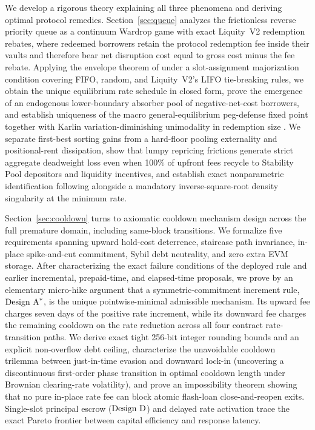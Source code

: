 We develop a rigorous theory explaining all three phenomena and deriving optimal protocol remedies. Section~\ref{sec:queue} analyzes the frictionless reverse priority queue as a continuum Wardrop game with exact Liquity~V2 redemption rebates, where redeemed borrowers retain the protocol redemption fee inside their vaults and therefore bear net disruption cost equal to gross cost minus the fee rebate. Applying the envelope theorem of \citet{milgrom2002envelope} under a slot-assignment majorization condition covering FIFO, random, and Liquity~V2's LIFO tie-breaking rules, we obtain the unique equilibrium rate schedule in closed form, prove the emergence of an endogenous lower-boundary absorber pool of negative-net-cost borrowers, and establish uniqueness of the macro general-equilibrium peg-defense fixed point together with Karlin variation-diminishing unimodality in redemption size \citep{karlin1968total}. We separate first-best sorting gains from a hard-floor pooling externality and positional-rent dissipation, show that lumpy repricing frictions generate strict aggregate deadweight loss even when 100\% of upfront fees recycle to Stability Pool depositors and liquidity incentives, and establish exact nonparametric identification following \citet{guerre2000optimal} alongside a mandatory inverse-square-root density singularity at the minimum rate.

Section~\ref{sec:cooldown} turns to axiomatic cooldown mechanism design across the full premature domain, including same-block transitions. We formalize five requirements spanning upward hold-cost deterrence, staircase path invariance, in-place spike-and-cut commitment, Sybil debt neutrality, and zero extra EVM storage. After characterizing the exact failure conditions of the deployed rule and earlier incremental, prepaid-time, and elapsed-time proposals, we prove by an elementary micro-hike argument that a symmetric-commitment increment rule, $\textup{Design A}^*$, is the unique pointwise-minimal admissible mechanism. Its upward fee charges seven days of the positive rate increment, while its downward fee charges the remaining cooldown on the rate reduction across all four contract rate-transition paths. We derive exact tight 256-bit integer rounding bounds and an explicit non-overflow debt ceiling, characterize the unavoidable cooldown trilemma between just-in-time evasion and downward lock-in (uncovering a discontinuous first-order phase transition in optimal cooldown length under Brownian clearing-rate volatility), and prove an impossibility theorem showing that no pure in-place rate fee can block atomic flash-loan close-and-reopen exits. Single-slot principal escrow ($\textup{Design D}$) and delayed rate activation trace the exact Pareto frontier between capital efficiency and response latency.

